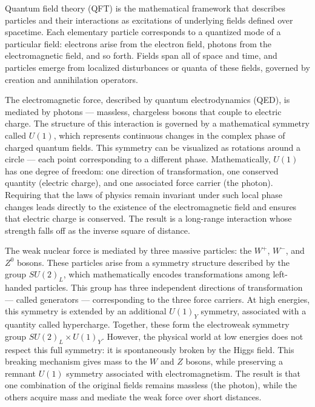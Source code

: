 Quantum field theory (QFT) is the mathematical framework that describes particles and their interactions as excitations of underlying fields defined over spacetime. Each elementary particle corresponds to a quantized mode of a particular field: electrons arise from the electron field, photons from the electromagnetic field, and so forth. Fields span all of space and time, and particles emerge from localized disturbances or quanta of these fields, governed by creation and annihilation operators.

The electromagnetic force, described by quantum electrodynamics (QED), is mediated by photons — massless, chargeless bosons that couple to electric charge. The structure of this interaction is governed by a mathematical symmetry called \(U(1)\), which represents continuous changes in the complex phase of charged quantum fields. This symmetry can be visualized as rotations around a circle — each point corresponding to a different phase. Mathematically, \(U(1)\) has one degree of freedom: one direction of transformation, one conserved quantity (electric charge), and one associated force carrier (the photon). Requiring that the laws of physics remain invariant under such local phase changes leads directly to the existence of the electromagnetic field and ensures that electric charge is conserved. The result is a long-range interaction whose strength falls off as the inverse square of distance.

The weak nuclear force is mediated by three massive particles: the \(W^+\), \(W^-\), and \(Z^0\) bosons. These particles arise from a symmetry structure described by the group \(SU(2)_L\), which mathematically encodes transformations among left-handed particles. This group has three independent directions of transformation — called generators — corresponding to the three force carriers. At high energies, this symmetry is extended by an additional \(U(1)_Y\) symmetry, associated with a quantity called hypercharge. Together, these form the electroweak symmetry group \(SU(2)_L \times U(1)_Y\). However, the physical world at low energies does not respect this full symmetry: it is spontaneously broken by the Higgs field. This breaking mechanism gives mass to the \(W\) and \(Z\) bosons, while preserving a remnant \(U(1)\) symmetry associated with electromagnetism. The result is that one combination of the original fields remains massless (the photon), while the others acquire mass and mediate the weak force over short distances.


